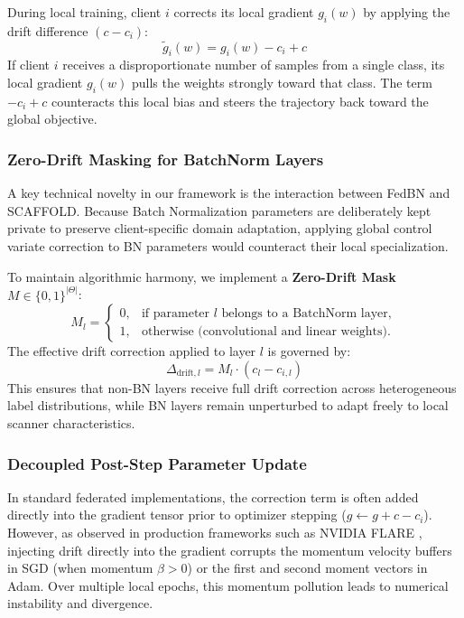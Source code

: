 During local training, client $i$ corrects its local gradient $g_i(w)$ by applying the drift difference $(c - c_i)$:
\begin{equation}
    \tilde{g}_i(w) = g_i(w) - c_i + c
    \label{eq:scaffold_drift_grad}
\end{equation}
If client $i$ receives a disproportionate number of samples from a single class, its local gradient $g_i(w)$ pulls the weights strongly toward that class. The term $- c_i + c$ counteracts this local bias and steers the trajectory back toward the global objective.

\subsubsection{Zero-Drift Masking for BatchNorm Layers}
A key technical novelty in our framework is the interaction between FedBN and SCAFFOLD. Because Batch Normalization parameters are deliberately kept private to preserve client-specific domain adaptation, applying global control variate correction to BN parameters would counteract their local specialization.

To maintain algorithmic harmony, we implement a \textbf{Zero-Drift Mask} $M \in \{0, 1\}^{|\Theta|}$:
\begin{equation}
    M_l = \begin{cases}
        0, & \text{if parameter } l \text{ belongs to a BatchNorm layer}, \\
        1, & \text{otherwise (convolutional and linear weights)}.
    \end{cases}
    \label{eq:zero_drift_mask}
\end{equation}
The effective drift correction applied to layer $l$ is governed by:
\begin{equation}
    \Delta_{\text{drift}, l} = M_l \cdot (c_l - c_{i, l})
    \label{eq:masked_drift}
\end{equation}
This ensures that non-BN layers receive full drift correction across heterogeneous label distributions, while BN layers remain unperturbed to adapt freely to local scanner characteristics.

\subsubsection{Decoupled Post-Step Parameter Update}
In standard federated implementations, the correction term is often added directly into the gradient tensor prior to optimizer stepping ($g \leftarrow g + c - c_i$). However, as observed in production frameworks such as NVIDIA FLARE \cite{roth2022nvidia}, injecting drift directly into the gradient corrupts the momentum velocity buffers in SGD (when momentum $\beta > 0$) or the first and second moment vectors in Adam. Over multiple local epochs, this momentum pollution leads to numerical instability and divergence.

